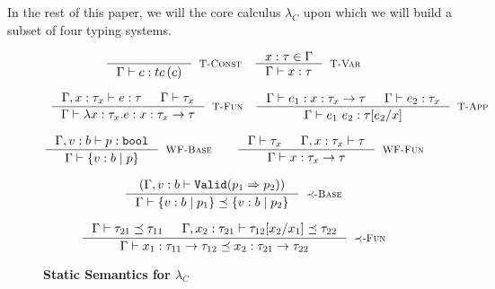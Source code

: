 In the rest of this paper, we will the core calculus $\lambda_C$
upon which we will build a subset of four typing systems\cite{TODO}.


\begin{figure}[ht!]
\medskip {}

\begin{comment}
$$\begin{array}{cc}

\inference
  {  \hastype{\Gamma}{e}{\tau_2} && \isSubType{\Gamma}{\tau_2}{\tau_1} 
  && \isWellFormed{\Gamma}{\tau_1}
  }
  {\hastype{\Gamma}{e}{\tau_1}}
  [\tsub]
\end{array}$$
\end{comment}
$$\begin{array}{cc}

\inference
  {}
  {\hastype{\Gamma}{c}{\tc{c}}}
  [\tconst]
&
\inference
  {x:\tau \in \Gamma}
  {\hastype{\Gamma}{x}{\tau}} 
  [\tvariable]

\end{array}$$

$$\begin{array}{cc}

\inference
  {\hastype{\Gamma, x:\tau_x}{e}{\tau} &&     
  \isWellFormed{\Gamma}{\tau_x}
  }
  {\hastype{\Gamma}{\efunt{x}{\tau_x}{e}}{\tfun{x}{\tau_x}{\tau}}}
  [\tfunction]
&
\inference
  {\hastype{\Gamma}{e_1}{\tfun{x}{\tau_x}{\tau}} &&
   \hastype{\Gamma}{e_2}{\tau_x}
  }
  {\hastype{\Gamma}{\eapp{e_1}{e_2}}{\tau[e_2/x]}} 
  [\tapp]

\end{array}$$


$$\inference
    {\hastype{\Gamma, v:b}{p}{\tbbool}}
    {\isWellFormed{\Gamma}{\tref{b}{p}}}
    [\wtBase]
\qquad
\inference
    {
    \isWellFormed{\Gamma}{\tau_x} &&
	\isWellFormed{\Gamma, x:\tau_x}{\tau}
    }
    {\isWellFormed{\Gamma}{\tfun{x}{\tau_x}{\tau}}}
    [\wtFun]
$$


\medskip {}

$$
\inference
   {(\Gamma, v:b \vdash \texttt{Valid}(p_1 \Rightarrow p_2))}
   {\isSubType{\Gamma}{\tref{b}{p_1}}{\tref{b}{p_2}}}
   [\tsubBase]
$$

$$
\inference
   {\isSubType{\Gamma}{\tau_{21}}{\tau_{11}} &
	\isSubType{\Gamma, x_2:{\tau_{21}}}{\SUBST{\tau_{12}}{x_1}{x_2}}{\tau_{22}}	
   }
   {\isSubType{\Gamma}
	  {\tfun{x_1}{\tau_{11}}{\tau_{12}}}
	  {\tfun{x_2}{\tau_{21}}{\tau_{22}}}
}[\tsubFun]
$$
\caption{\textbf{Static Semantics for $\lambda_C$}}
\label{fig:corerules}
\end{figure}